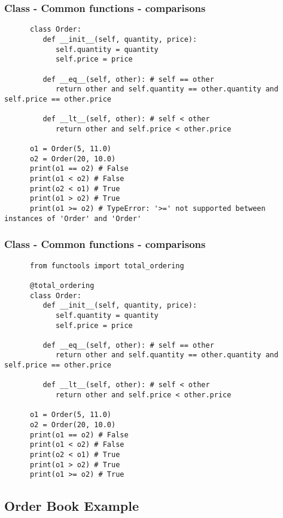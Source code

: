 \begin{frame}[fragile]
\frametitle{Class - Common functions - comparisons}
   \begin{verbatim}
      class Order:
         def __init__(self, quantity, price):
            self.quantity = quantity
            self.price = price

         def __eq__(self, other): # self == other
            return other and self.quantity == other.quantity and self.price == other.price

         def __lt__(self, other): # self < other
            return other and self.price < other.price

      o1 = Order(5, 11.0)
      o2 = Order(20, 10.0)
      print(o1 == o2) # False
      print(o1 < o2) # False
      print(o2 < o1) # True
      print(o1 > o2) # True
      print(o1 >= o2) # TypeError: '>=' not supported between instances of 'Order' and 'Order'
   \end{verbatim}
\end{frame}

\begin{frame}[fragile]
\frametitle{Class - Common functions - comparisons}
   \begin{verbatim}
      from functools import total_ordering

      @total_ordering
      class Order:
         def __init__(self, quantity, price):
            self.quantity = quantity
            self.price = price

         def __eq__(self, other): # self == other
            return other and self.quantity == other.quantity and self.price == other.price

         def __lt__(self, other): # self < other
            return other and self.price < other.price

      o1 = Order(5, 11.0)
      o2 = Order(20, 10.0)
      print(o1 == o2) # False
      print(o1 < o2) # False
      print(o2 < o1) # True
      print(o1 > o2) # True
      print(o1 >= o2) # True
   \end{verbatim}
\end{frame}


\subsection{Order Book Example}

